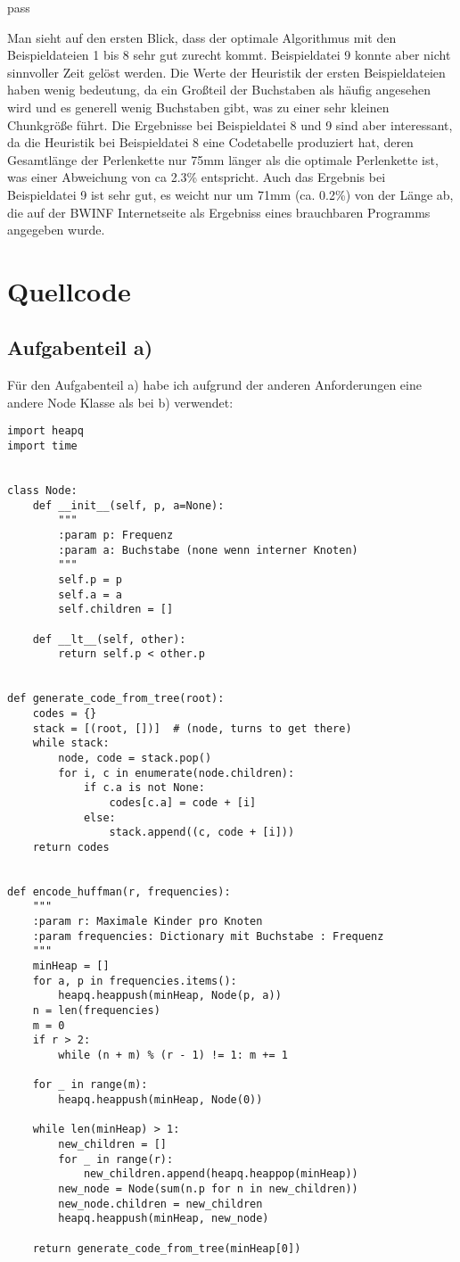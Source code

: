 pass\documentclass[a4paper,10pt,ngerman]{scrartcl}
\begin{document}
    Man sieht auf den ersten Blick, dass der optimale Algorithmus mit den Beispieldateien 1 bis 8 sehr gut zurecht kommt.
    Beispieldatei 9 konnte aber nicht sinnvoller Zeit gelöst werden.
    Die Werte der Heuristik der ersten Beispieldateien haben wenig bedeutung, da ein Großteil der Buchstaben als häufig angesehen wird und es generell wenig Buchstaben gibt, was zu einer sehr kleinen Chunkgröße führt.
    Die Ergebnisse bei Beispieldatei 8 und 9 sind aber interessant, da die Heuristik bei Beispieldatei 8 eine Codetabelle produziert hat, deren Gesamtlänge der Perlenkette nur 75mm länger als die optimale Perlenkette ist, was einer Abweichung von ca 2.3\% entspricht.
    Auch das Ergebnis bei Beispieldatei 9 ist sehr gut, es weicht nur um 71mm (ca. 0.2\%) von der Länge ab, die auf der BWINF Internetseite als Ergebniss eines brauchbaren Programms angegeben wurde.


    \section{Quellcode}

    \subsection{Aufgabenteil a)}
    Für den Aufgabenteil a) habe ich aufgrund der anderen Anforderungen eine andere Node Klasse als bei b) verwendet:
    \begin{verbatim}
import heapq
import time


class Node:
    def __init__(self, p, a=None):
        """
        :param p: Frequenz
        :param a: Buchstabe (none wenn interner Knoten)
        """
        self.p = p
        self.a = a
        self.children = []

    def __lt__(self, other):
        return self.p < other.p


def generate_code_from_tree(root):
    codes = {}
    stack = [(root, [])]  # (node, turns to get there)
    while stack:
        node, code = stack.pop()
        for i, c in enumerate(node.children):
            if c.a is not None:
                codes[c.a] = code + [i]
            else:
                stack.append((c, code + [i]))
    return codes


def encode_huffman(r, frequencies):
    """
    :param r: Maximale Kinder pro Knoten
    :param frequencies: Dictionary mit Buchstabe : Frequenz
    """
    minHeap = []
    for a, p in frequencies.items():
        heapq.heappush(minHeap, Node(p, a))
    n = len(frequencies)
    m = 0
    if r > 2:
        while (n + m) % (r - 1) != 1: m += 1

    for _ in range(m):
        heapq.heappush(minHeap, Node(0))

    while len(minHeap) > 1:
        new_children = []
        for _ in range(r):
            new_children.append(heapq.heappop(minHeap))
        new_node = Node(sum(n.p for n in new_children))
        new_node.children = new_children
        heapq.heappush(minHeap, new_node)

    return generate_code_from_tree(minHeap[0])
    \end{verbatim}
\end{document}
